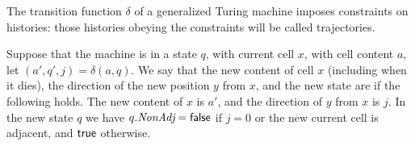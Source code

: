 \documentclass[12pt]{memoir}
\newcommand{\fld}[1]{\ensuremath{\textit{#1}}}
\newcommand{\NonAdj}{\fld{NonAdj}}
\begin{document}
The transition function \( \delta \) of a generalized Turing machine
imposes constraints on histories: those
histories obeying the constraints will be called trajectories.

\begin{definition}
Suppose that the machine is in a state \( q \), with current cell \( x \), 
with cell content \( a \), let \( (a',q',j) = \delta(a,q) \).
We say that the new content of cell \( x \) (including when it dies),
the direction of the new position \( y \) from \( x \),
and the new state are  if
the following holds.
The new content of \( x \) is \( a' \), and
the direction of \( y \) from \( x \) is \( j \).
In the new state \( q \) we have \( q.\NonAdj=\false \)
if \( j=0 \) or the new current cell is adjacent, and \( \hbox{\sffamily true} \) otherwise.  
\end{definition}
\end{document}
